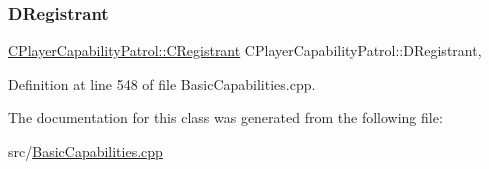 \subsubsection{\texorpdfstring{D\+Registrant}{DRegistrant}}
{\footnotesize\ttfamily \hyperlink{classCPlayerCapabilityPatrol_1_1CRegistrant}{C\+Player\+Capability\+Patrol\+::\+C\+Registrant} C\+Player\+Capability\+Patrol\+::\+D\+Registrant\hspace{0.3cm}{\ttfamily [static]}, {\ttfamily [protected]}}



Definition at line 548 of file Basic\+Capabilities.\+cpp.



The documentation for this class was generated from the following file\+:\begin{DoxyCompactItemize}
\item 
src/\hyperlink{BasicCapabilities_8cpp}{Basic\+Capabilities.\+cpp}\end{DoxyCompactItemize}
